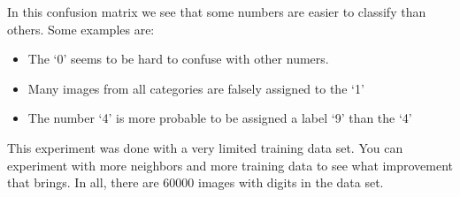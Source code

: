 \documentclass[letterpaper,10pt,english]{sphinxmanual}
\begin{document}
\begin{sphinxVerbatim}[commandchars=\\\{\}]
    
  \PYG{p}{[}\PYG{p}{]} 
  \PYG{p}{[}\PYG{p}{]}  
\PYG{p}{[}\PYG{p}{]} 
\end{sphinxVerbatim}

\noindent{}

\sphinxAtStartPar
In this confusion matrix we see that some numbers are easier to classify than others. Some examples are:
\begin{itemize}
\item {} 
\sphinxAtStartPar
The ‘0’ seems to be hard to confuse with other numers.

\item {} 
\sphinxAtStartPar
Many images from all categories are falsely assigned to the ‘1’

\item {} 
\sphinxAtStartPar
The number ‘4’ is more probable to be assigned a label ‘9’ than the ‘4’

\end{itemize}

\sphinxAtStartPar
This experiment was done with a very limited training data set. You can experiment with more neighbors and more training data to see what improvement that brings. In all, there are 60000 images with digits in the data set.
\end{document}
